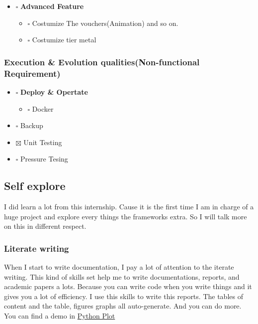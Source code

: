 \documentclass[12pt]{scrartcl}
\begin{document}
\begin{enumerate}
\begin{itemize}
\item $\square$ \textbf{Advanced Feature}
\begin{itemize}
\item $\square$ Costumize The vouchers(Animation) and so on.
\item $\square$ Costumize tier metal
\end{itemize}
\end{itemize}
\end{enumerate}


\subsubsection{Execution \& Evolution qualities(Non-functional Requirement)}
\label{sec:org0f08393}

\begin{itemize}
\item $\square$ \textbf{Deploy \& Opertate}
\begin{itemize}
\item $\square$ Docker
\end{itemize}

\item $\square$ Backup

\item $\boxtimes$ Unit Testing

\item $\square$ Pressure Tesing
\end{itemize}

\subsection{Self explore}
\label{sec:orgf98fa74}
I did learn a lot from this internship. Cause it is the first time I am
in charge of a huge project and explore every things the frameworks extra.
So I will talk more on this in different respect.
\subsubsection{Literate writing}
\label{sec:orgc2d442b}
When I start to write documentation, I pay a lot of attention to the iterate
writing. This kind of skills set help me to write documentations, reports,
and academic papers a lots. Because you can write code when you write things
and it gives you a lot of efficiency. I use this skills to write this
reports. The tables of content and the table, figures graphs all
auto-generate. And you can do more. You can find a demo in
\hyperref[fig:org8850b04]{Python Plot}
\end{document}
